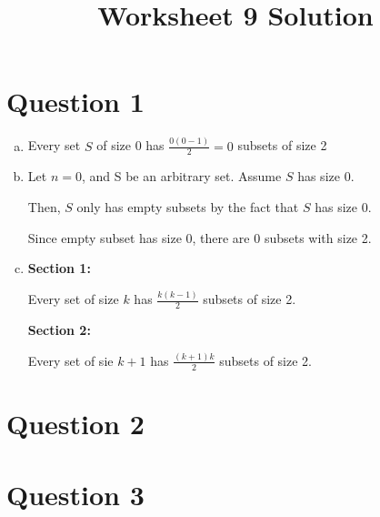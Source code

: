 \documentclass[12pt]{article}
\begin{document}
\title{Worksheet 9 Solution}
\maketitle

\section*{Question 1}
\begin{enumerate}[a.]
    \item

    Every set $S$ of size 0 has $\frac{0(0-1)}{2} = 0$ subsets of size 2

    \item

    Let $n = 0$, and S be an arbitrary set. Assume $S$ has size 0.

    \bigskip

    Then, $S$ only has empty subsets by the fact that $S$ has size 0.

    \bigskip

    Since empty subset has size 0, there are 0 subsets with size 2.

    \item

    \textbf{Section 1:}

    \bigskip

    Every set of size $k$ has $\frac{k(k-1)}{2}$ subsets of size 2.

    \bigskip

    \textbf{Section 2:}

    \bigskip

    Every set of sie $k+1$ has $\frac{(k+1)k}{2}$ subsets of size 2.


\end{enumerate}

\section*{Question 2}

\section*{Question 3}
\end{document}
